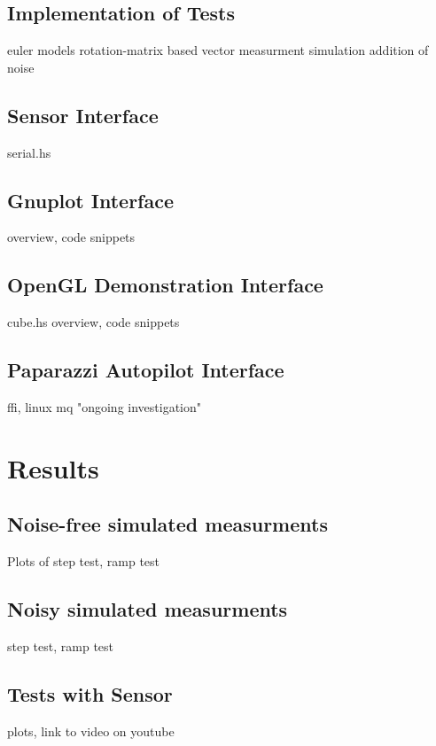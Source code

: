 \documentclass[12pt]{report}
\begin{document}
\subsection{Implementation of Tests}
euler models
rotation-matrix based vector measurment simulation
addition of noise
\subsection{Sensor Interface}
serial.hs
\subsection{Gnuplot Interface}
overview, code snippets
\subsection{OpenGL Demonstration Interface}
cube.hs overview, code snippets 
\subsection{Paparazzi Autopilot Interface}
ffi, linux mq
"ongoing investigation"

\section{Results}
\subsection{Noise-free simulated measurments}
Plots of step test, ramp test
\subsection{Noisy simulated measurments}
step test, ramp test
\subsection{Tests with Sensor}
plots, link to video on youtube
\end{document}
